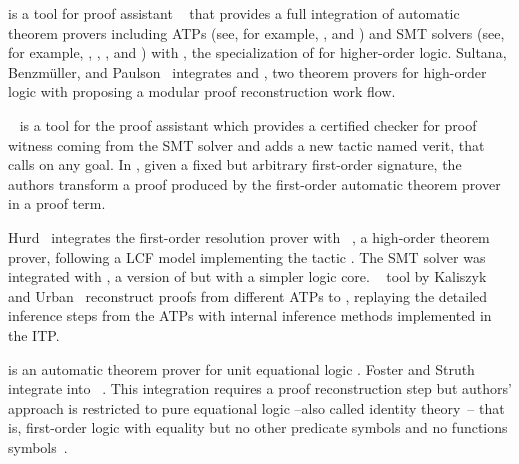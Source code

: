 \documentclass[runningheads,a4paper]{llncs}
\begin{document}
 is a tool for  proof assistant
~\cite{paulson1994isabelle} that provides a full integration of automatic
theorem provers including ATPs (see, for example, \cite{meng2006automation},
\cite{blanchette2013extending} and \cite{Fleury2014}) and SMT solvers (see,
for example, \cite{hurlin07practical}, \cite{bohme2010},
\cite{blanchette2013extending}, and \cite{Fleury2014}) with 
\cite{nipkow2002isabelle}, the specialization of  for
higher-order logic. Sultana, Benzm{\"{u}}ller, and Paulson~\cite{Een2004}
integrates  and , two theorem provers for high-order
logic with  proposing a modular proof reconstruction work flow.

~\cite{armand2011,Ekici2017} is a tool for the  proof
assistant \cite{coqteam} which provides a certified checker for proof witness
coming from the SMT solver  \cite{bouton2009} and adds a new tactic
named verit, that calls  on any  goal.
In \cite{bezem2002automated}, given a fixed but arbitrary first-order signature,
the authors transform a proof produced by the first-order automatic theorem
prover  \cite{deNivelle2003} in a  proof term.

Hurd~\cite{Hurd1999} integrates the first-order resolution prover 
with ~\cite{norrish2007hol}, a high-order theorem prover, following a
LCF model implementing the tactic . The SMT solver 
was integrated with , a version of  but with a simpler
logic core. ~ tool by Kaliszyk and Urban~\cite{kaliszyk2013}
reconstruct proofs from different ATPs to , replaying the
detailed inference steps from the ATPs with internal inference methods
implemented in the ITP.

 is an automatic theorem prover for unit equational logic
\cite{hillenbrand1997}. Foster and Struth~\cite{foster2011integrating} integrate
 into ~\cite{agdateam}. This integration requires a
proof reconstruction step but authors' approach is restricted to pure equational
logic --also called identity theory~\cite{humberstone2011}-- that is,
first-order logic with equality but no other predicate symbols and no functions
symbols~\cite{appel1959}.
\end{document}
